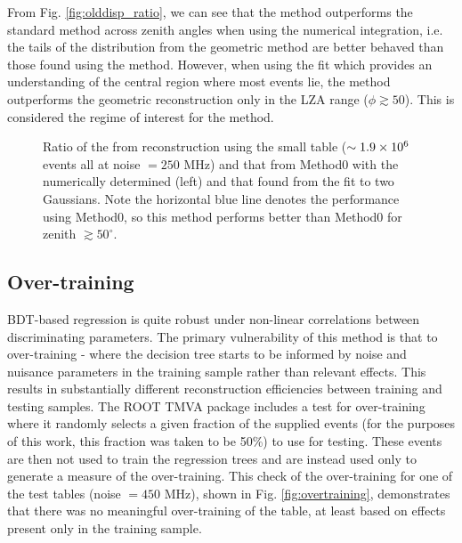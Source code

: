\documentclass[main.tex]{subfiles}
\begin{document}
From Fig. \ref{fig:olddisp_ratio}, we can see that the \disp method outperforms the standard method across zenith angles when using the numerical integration, i.e. the tails of the distribution from the geometric method are better behaved than those found using the \disp method. However, when using the fit which provides an understanding of the central region where most events lie, the \disp method outperforms the geometric reconstruction only in the LZA range ($\phi\gtrsim 50$). This is considered the regime of interest for the \disp method.

\begin{figure}[H]
  \centering
  \caption[Small \disp table reconstruction (noise = $250$ MHz).]{Ratio of the \rse from reconstruction using the small \disp table ($\sim 1.9\times 10^{6}$ events all at noise $= 250$ MHz) and that from Method0 with the numerically determined \rse (left) and that found from the fit to two Gaussians. Note the horizontal blue line denotes the performance using Method0, so this method performs better than Method0 for zenith $\gtrsim 50^\circ$.}
  \label{fig:disp_ratio_250}
\end{figure}

\subsection{Over-training}
BDT-based regression is quite robust under non-linear correlations between discriminating parameters. The primary vulnerability of this method is that  to over-training - where the decision tree starts to be informed by noise and nuisance parameters in the training sample rather than relevant effects. This results in substantially different reconstruction efficiencies between training and testing samples. The ROOT TMVA package includes a test for over-training where it randomly selects a given fraction of the supplied events (for the purposes of this work, this fraction was taken to be 50\%) to use for testing. These events are then not used to train the regression trees and are instead used only to generate a measure of the over-training.
This check of the over-training for one of the test tables (noise $= 450$ MHz), shown in Fig. \ref{fig:overtraining}, demonstrates that there was no meaningful over-training of the table, at least based on effects present only in the training sample.
\end{document}
